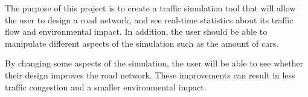 
The purpose of this project is to create a traffic simulation tool that will allow the user to design a road network, and see real-time statistics about its traffic flow and environmental impact. In addition, the user should be able to manipulate different aspects of the simulation such as the amount of cars.

 By changing some aspects of the simulation, the user will be able to see whether their design improves the road network. These improvements can result in less traffic congestion and a smaller environmental impact.